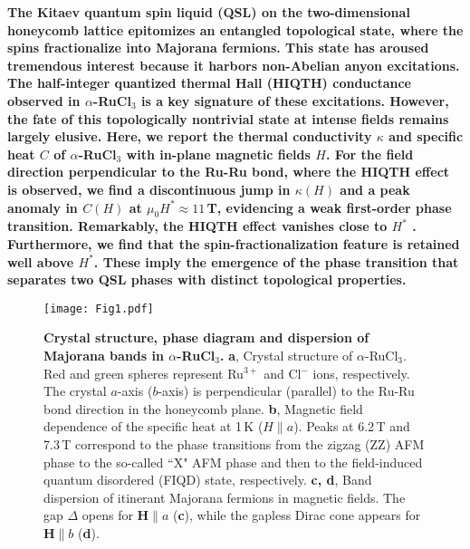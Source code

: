 \documentclass[twocolumn,preprintnumbers,prl,superscriptaddress,amsmath,amssymb,amsfonts]{revtex4}
\begin{document}
\date{\today}



\maketitle

\textbf{The Kitaev quantum spin liquid (QSL) \cite{kitaev2006anyons} on the two-dimensional honeycomb lattice epitomizes an entangled topological state, where the spins fractionalize into Majorana fermions. This state has aroused tremendous interest because it harbors non-Abelian anyon excitations. The half-integer quantized thermal Hall (HIQTH) conductance observed in $\alpha$-RuCl$_3$ \cite{kasahara2018majorana,yokoi2021half,PhysRevB.102.220404,bruin2021robustness} is a key signature of these excitations.  However, the fate of this topologically nontrivial state at intense fields remains largely elusive. Here, we report the thermal conductivity $\kappa$ and specific heat $C$ of $\alpha$-RuCl$_3$ with in-plane magnetic fields $H$. For the field direction perpendicular to the Ru-Ru bond, where the HIQTH effect is observed, we find a discontinuous jump in $\kappa(H)$ and a peak anomaly in $C(H)$ at $\mu_0H^*\approx11$\,T, evidencing a weak first-order phase transition. Remarkably, the HIQTH effect vanishes close to $H^*$ \cite{yokoi2021half}. Furthermore, we find that the spin-fractionalization feature is retained well above $H^\ast$. These imply the emergence of the phase transition that separates two QSL phases with distinct topological properties.
}

\begin{figure}[b]
	\texttt{[image: Fig1.pdf]}
	\caption{\textbf{Crystal structure, phase diagram and dispersion of Majorana bands in $\alpha$-RuCl$ _3$.}
		{\bf a}, Crystal structure of $\alpha$-RuCl$ _3$. Red and green spheres represent Ru$ ^{3+}$ and Cl$ ^{-}$ ions, respectively. The crystal $a$-axis ($b$-axis) is perpendicular (parallel) to the Ru-Ru bond direction in the honeycomb plane. {\bf b}, Magnetic field dependence of the specific heat at 1\,K ({\boldmath $H$}$\parallel a$). Peaks at 6.2\,T and 7.3\,T correspond to the phase transitions from the zigzag (ZZ) AFM phase to the so-called ``X" AFM phase and then to the field-induced quantum disordered (FIQD) state, respectively. {\bf c, d}, Band dispersion of itinerant Majorana fermions in magnetic fields. The gap $\Delta$ opens for ${\bm H}\parallel a$ ({\bf c}), while the gapless Dirac cone appears for ${\bm H}\parallel b$ ({\bf d}).
		\label{fig:RuCl3}
	}
\end{figure}
\end{document}
